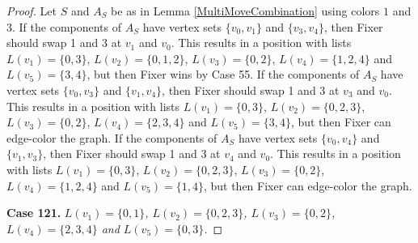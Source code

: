 \documentclass[12pt]{amsart}
\theoremstyle{plain}
\theoremstyle{definition}
\theoremstyle{remark}
\begin{document}
\begin{proof}
Let $S$ and $A_S$ be as in Lemma \ref{MultiMoveCombination} using colors $1$ and $3$. If the components of $A_S$ have vertex sets $\{v_0, v_1\}$ and $\{v_3, v_4\}$, then Fixer should swap 1 and 3 at $v_1$ and $v_0$. This results in a position with lists $L(v_1) = \{0, 3\}$, $L(v_2) = \{0, 1, 2\}$, $L(v_3) = \{0, 2\}$, $L(v_4) = \{1, 2, 4\}$ and $L(v_5) = \{3, 4\}$, but then Fixer wins by Case 55.
If the components of $A_S$ have vertex sets $\{v_0, v_3\}$ and $\{v_1, v_4\}$, then Fixer should swap 1 and 3 at $v_3$ and $v_0$. This results in a position with lists $L(v_1) = \{0, 3\}$, $L(v_2) = \{0, 2, 3\}$, $L(v_3) = \{0, 2\}$, $L(v_4) = \{2, 3, 4\}$ and $L(v_5) = \{3, 4\}$, but then Fixer can edge-color the graph.
If the components of $A_S$ have vertex sets $\{v_0, v_4\}$ and $\{v_1, v_3\}$, then Fixer should swap 1 and 3 at $v_4$ and $v_0$. This results in a position with lists $L(v_1) = \{0, 3\}$, $L(v_2) = \{0, 2, 3\}$, $L(v_3) = \{0, 2\}$, $L(v_4) = \{1, 2, 4\}$ and $L(v_5) = \{1, 4\}$, but then Fixer can edge-color the graph.

\noindent\textbf{Case 121.  }\textit{$L(v_1) = \{0, 1\}$, $L(v_2) = \{0, 2, 3\}$, $L(v_3) = \{0, 2\}$, $L(v_4) = \{2, 3, 4\}$ and $L(v_5) = \{0, 3\}$.}


\end{proof}
\end{document}
